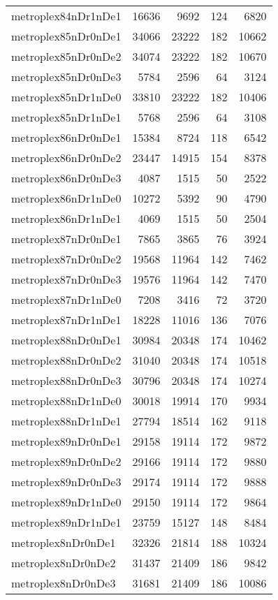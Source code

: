 \begin{longtable}{lrrrr}
metroplex84nDr1nDe1 & 16636 & 9692 & 124 & 6820 \\
metroplex85nDr0nDe1 & 34066 & 23222 & 182 & 10662 \\
metroplex85nDr0nDe2 & 34074 & 23222 & 182 & 10670 \\
metroplex85nDr0nDe3 & 5784 & 2596 & 64 & 3124 \\
metroplex85nDr1nDe0 & 33810 & 23222 & 182 & 10406 \\
metroplex85nDr1nDe1 & 5768 & 2596 & 64 & 3108 \\
metroplex86nDr0nDe1 & 15384 & 8724 & 118 & 6542 \\
metroplex86nDr0nDe2 & 23447 & 14915 & 154 & 8378 \\
metroplex86nDr0nDe3 & 4087 & 1515 & 50 & 2522 \\
metroplex86nDr1nDe0 & 10272 & 5392 & 90 & 4790 \\
metroplex86nDr1nDe1 & 4069 & 1515 & 50 & 2504 \\
metroplex87nDr0nDe1 & 7865 & 3865 & 76 & 3924 \\
metroplex87nDr0nDe2 & 19568 & 11964 & 142 & 7462 \\
metroplex87nDr0nDe3 & 19576 & 11964 & 142 & 7470 \\
metroplex87nDr1nDe0 & 7208 & 3416 & 72 & 3720 \\
metroplex87nDr1nDe1 & 18228 & 11016 & 136 & 7076 \\
metroplex88nDr0nDe1 & 30984 & 20348 & 174 & 10462 \\
metroplex88nDr0nDe2 & 31040 & 20348 & 174 & 10518 \\
metroplex88nDr0nDe3 & 30796 & 20348 & 174 & 10274 \\
metroplex88nDr1nDe0 & 30018 & 19914 & 170 & 9934 \\
metroplex88nDr1nDe1 & 27794 & 18514 & 162 & 9118 \\
metroplex89nDr0nDe1 & 29158 & 19114 & 172 & 9872 \\
metroplex89nDr0nDe2 & 29166 & 19114 & 172 & 9880 \\
metroplex89nDr0nDe3 & 29174 & 19114 & 172 & 9888 \\
metroplex89nDr1nDe0 & 29150 & 19114 & 172 & 9864 \\
metroplex89nDr1nDe1 & 23759 & 15127 & 148 & 8484 \\
metroplex8nDr0nDe1 & 32326 & 21814 & 188 & 10324 \\
metroplex8nDr0nDe2 & 31437 & 21409 & 186 & 9842 \\
metroplex8nDr0nDe3 & 31681 & 21409 & 186 & 10086 \\

\end{longtable}
